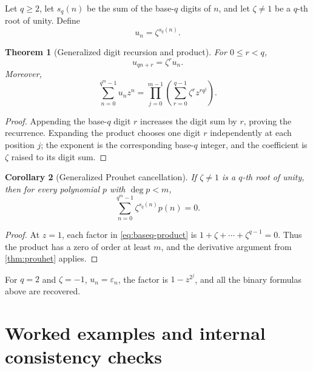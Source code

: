 \documentclass[11pt,oneside]{article}
\newtheorem{theorem}{Theorem}[section]
\newtheorem{corollary}[theorem]{Corollary}
\theoremstyle{definition}
\theoremstyle{remark}
\newcommand{\eps}{\varepsilon}
\newcommand{\1}{\mathbf 1}
\begin{document}
Let \(q\ge2\), let \(s_q(n)\) be the sum of the base-\(q\) digits of \(n\), and let
\(\zeta\ne1\) be a \(q\)-th root of unity.  Define
\begin{equation}
 u_n=\zeta^{s_q(n)}.
 \label{eq:generalized-TM}
\end{equation}

\begin{theorem}[Generalized digit recursion and product]
\label{thm:baseq-product}
For \(0\le r<q\),
\begin{equation}
 u_{qn+r}=\zeta^r u_n.
 \label{eq:baseq-recursion}
\end{equation}
Moreover,
\begin{equation}
 \boxed{
 \sum_{n=0}^{q^m-1}u_nz^n
 =\prod_{j=0}^{m-1}
   \left(\sum_{r=0}^{q-1}\zeta^r z^{rq^j}\right).}
 \label{eq:baseq-product}
\end{equation}
\end{theorem}

\begin{proof}
Appending the base-\(q\) digit \(r\) increases the digit sum by \(r\), proving the recurrence.
Expanding the product chooses one digit \(r\) independently at each position \(j\); the
exponent is the corresponding base-\(q\) integer, and the coefficient is \(\zeta\) raised to
its digit sum.
\end{proof}

\begin{corollary}[Generalized Prouhet cancellation]
\label{cor:baseq-prouhet}
If \(\zeta\ne1\) is a \(q\)-th root of unity, then for every polynomial \(p\) with
\(\deg p<m\),
\begin{equation}
 \sum_{n=0}^{q^m-1}\zeta^{s_q(n)}p(n)=0.
 \label{eq:baseq-prouhet}
\end{equation}
\end{corollary}

\begin{proof}
At \(z=1\), each factor in \eqref{eq:baseq-product} is
\(1+\zeta+\cdots+\zeta^{q-1}=0\).  Thus the product has a zero of order at least \(m\), and
the derivative argument from \cref{thm:prouhet} applies.
\end{proof}

For \(q=2\) and \(\zeta=-1\), \(u_n=\eps_n\), the factor is \(1-z^{2^j}\), and all the binary
formulas above are recovered.

\section{Worked examples and internal consistency checks}
\label{sec:examples}
\end{document}

